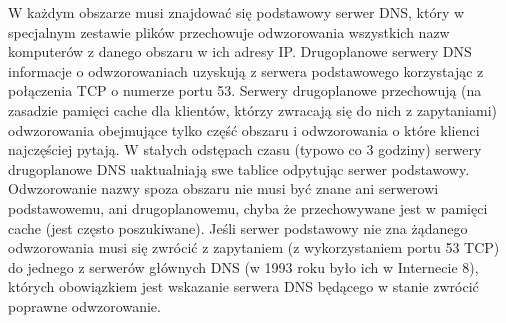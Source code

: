 W każdym obszarze musi znajdować się podstawowy serwer DNS, który w specjalnym zestawie plików przechowuje 
odwzorowania wszystkich nazw komputerów z danego obszaru w ich adresy IP. Drugoplanowe serwery DNS informacje o 
odwzorowaniach uzyskują z serwera podstawowego korzystając z połączenia TCP o numerze portu 53. Serwery 
drugoplanowe przechowują (na zasadzie pamięci cache dla klientów, którzy zwracają się do nich z zapytaniami) 
odwzorowania obejmujące tylko część obszaru i odwzorowania o które klienci najczęściej pytają. W stałych 
odstępach czasu (typowo co 3 godziny) serwery drugoplanowe DNS uaktualniają swe tablice odpytując serwer 
podstawowy. Odwzorowanie nazwy spoza obszaru nie musi być znane ani serwerowi podstawowemu, ani drugoplanowemu, 
chyba że przechowywane jest w pamięci cache (jest często poszukiwane). Jeśli serwer podstawowy nie zna żądanego 
odwzorowania musi się zwrócić z zapytaniem (z wykorzystaniem portu 53 TCP) do jednego z serwerów głównych DNS 
(w 1993 roku było ich w Internecie 8), których obowiązkiem jest wskazanie serwera DNS będącego w stanie zwrócić 
poprawne odwzorowanie.

